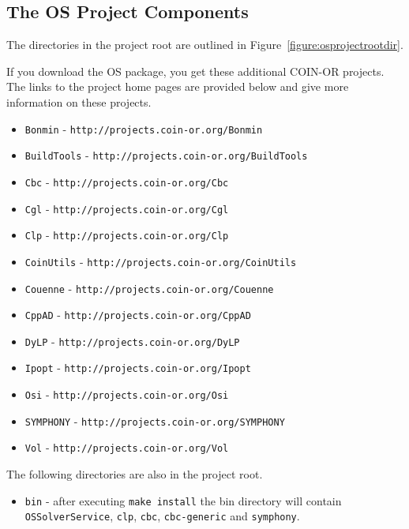 \documentclass[11pt]{article}
\newcounter{Fig}
\renewcommand{\_}{{\char"5F}}
\renewcommand{\{}{{\char"7B}}
\renewcommand{\}}{{\char"7D}}
\renewcommand{\^}{{\char"0D}}
\renewcommand{\'}{{\char"0D}}
\newcommand{\UrlBonmin}{http://projects.coin-or.org/Bonmin}
\newcommand{\UrlBuildtools}{http://projects.coin-or.org/BuildTools}
\newcommand{\UrlCbc}{http://projects.coin-or.org/Cbc}
\newcommand{\UrlCgl}{http://projects.coin-or.org/Cgl}
\newcommand{\UrlClp}{http://projects.coin-or.org/Clp}
\newcommand{\UrlCoinUtils}{http://projects.coin-or.org/CoinUtils}
\newcommand{\UrlCouenne}{http://projects.coin-or.org/Couenne}
\newcommand{\UrlCppad}{http://projects.coin-or.org/CppAD}
\newcommand{\UrlDylp}{http://projects.coin-or.org/DyLP}
\newcommand{\UrlIpopt}{http://projects.coin-or.org/Ipopt}
\newcommand{\UrlOsi}{http://projects.coin-or.org/Osi}
\newcommand{\UrlSymphony}{http://projects.coin-or.org/SYMPHONY}
\newcommand{\UrlVol}{http://projects.coin-or.org/Vol}
\begin{document}
\begin{enumerate}[Step 1:]
\section{The OS Project Components}\label{section:projectcomponents}

The directories in the  project root  are outlined in Figure~\ref{figure:osprojectrootdir}.

If you download the OS package, you get these additional COIN-OR projects. The links to the project home pages are provided below and give more information on these projects.
\begin{itemize}
\item {\tt Bonmin} - {\tt\UrlBonmin}
\item {\tt BuildTools} - {\tt\UrlBuildtools}
\item {\tt Cbc} - {\tt\UrlCbc}
\item {\tt Cgl} - {\tt\UrlCgl}
\item {\tt Clp} - {\tt\UrlClp}
\item {\tt CoinUtils} - {\tt\UrlCoinUtils}
\item {\tt Couenne} - {\tt\UrlCouenne}
\item {\tt CppAD} - {\tt\UrlCppad}
\item {\tt DyLP}  - {\tt\UrlDylp}
\item {\tt Ipopt} - {\tt\UrlIpopt}
\item {\tt Osi} - {\tt\UrlOsi}
\item {\tt SYMPHONY}   - {\tt\UrlSymphony}
\item {\tt Vol} - {\tt\UrlVol}
\end{itemize}

The following directories are also in the project root.
\begin{itemize}
\item {\tt bin} - after executing {\tt make install} the bin directory will contain 
{\tt OSSolverService}, {\tt clp}, {\tt cbc},  
{\tt cbc-generic} and {\tt symphony}.


\end{itemize}
\end{enumerate}
\end{document}
